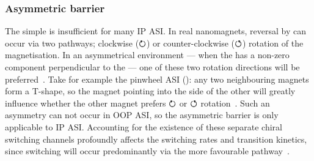 \subsubsection{Asymmetric barrier}
The simple  is insufficient for many IP ASI.
In real nanomagnets, reversal by  can occur via two pathways; clockwise ($\boldsymbol{\circlearrowright}$) or counter-clockwise ($\boldsymbol{\circlearrowleft}$) rotation of the magnetisation.
In an asymmetrical environment --- when the  has a non-zero component perpendicular to the  --- one of these two rotation directions will be preferred~\cite{leo2021chiral,DirectionalEnergyBarrier}.
Take for example the pinwheel ASI (): any two neighbouring magnets form a T-shape, so the magnet pointing into the side of the other will greatly influence whether the other magnet prefers $\boldsymbol{\circlearrowright}$ or $\boldsymbol{\circlearrowleft}$ rotation~\cite{DirectionalEnergyBarrier}. %
Such an asymmetry can not occur in OOP ASI, so the asymmetric barrier is only applicable to IP ASI.
Accounting for the existence of these separate chiral switching channels profoundly affects the switching rates and transition kinetics, since switching will occur predominantly via the more favourable pathway~\cite{leo2021chiral}. \\\par

